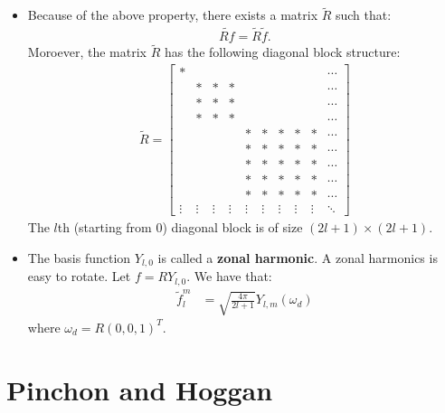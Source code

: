 \documentclass[10pt]{article}
\begin{document}
\begin{itemize}
        \item Because of the above property, there exists a matrix $\tilde{R}$ such that:
        \begin{align*}
            \widetilde{Rf} = \tilde{R} \tilde{f}.
        \end{align*}
        Moroever, the matrix $\tilde{R}$ has the following diagonal block structure:
        \begin{align*}
            \tilde{R} = \begin{bmatrix}
                * &   &   &   &   &   &   &   &   & \cdots \\
                  & * & * & * &   &   &   &   &   & \cdots \\
                  & * & * & * &   &   &   &   &   & \cdots \\
                  & * & * & * &   &   &   &   &   & \cdots \\
                  &   &   &   & * & * & * & * & * & \cdots \\  
                  &   &   &   & * & * & * & * & * & \cdots \\  
                  &   &   &   & * & * & * & * & * & \cdots \\  
                  &   &   &   & * & * & * & * & * & \cdots \\  
                  &   &   &   & * & * & * & * & * & \cdots \\  
                \vdots & \vdots & \vdots & \vdots & \vdots & \vdots & \vdots & \vdots & \vdots & \ddots
            \end{bmatrix}
        \end{align*}
        The $l$th (starting from $0$) diagonal block is of size $(2l+1)\times(2l+1)$.

        \item The basis function $Y_{l,0}$ is called a \textbf{zonal harmonic}.  A zonal harmonics is easy to rotate.  Let $f = RY_{l,0}$.  We have that:
        \begin{align*}
            \tilde{f}_l^m &= \sqrt{\frac{4\pi}{2l+1}} Y_{l,m}(\omega_d)
        \end{align*}
        where $\omega_d = R(0,0,1)^T$.
    \end{itemize}

    \section{Pinchon and Hoggan}
\end{document}
